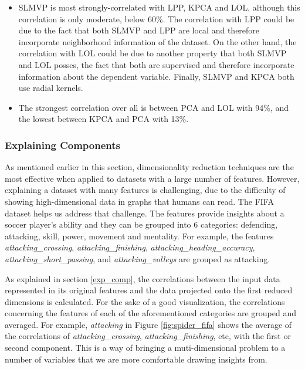 \begin{itemize}
    \item SLMVP is most strongly-correlated with LPP, KPCA and LOL, although this correlation is only moderate, below 60\%. The correlation with LPP could be due to the fact that both SLMVP and LPP are local and therefore incorporate neighborhood information of the dataset. On the other hand, the correlation with LOL could be due to another property that both SLMVP and LOL posses, the fact that both are supervised and therefore incorporate information about the dependent variable. Finally, SLMVP and KPCA both use radial kernels.
    \item The strongest correlation over all is between PCA and LOL with 94\%, and the lowest between KPCA and PCA with 13\%.
\end{itemize}

\subsubsection{Explaining Components}

As mentioned earlier in this section, dimensionality reduction techniques are the most effective when applied to datasets with a large number of features. However, explaining a dataset with many features is challenging, due to the difficulty of showing high-dimensional data in graphs that humans can read. The FIFA dataset helps us address that challenge. The features provide insights about a soccer player's ability and they can be grouped into 6 categories: defending, attacking, skill, power, movement and mentality. For example, the features \textit{attacking\_crossing}, \textit{attacking\_finishing}, \textit{attacking\_heading\_accuracy}, \textit{attacking\_short\_passing}, and \textit{attacking\_volleys} are grouped as attacking.

As explained in section \ref{exp_comp}, the correlations between the input data represented in its original features and the data projected onto the first reduced dimensions is calculated. For the sake of a good visualization, the correlations concerning the features of each of the aforementioned categories are grouped and averaged. For example, \textit{attacking} in Figure \ref{fig:spider_fifa} shows the average of the correlations of \textit{attacking\_crossing}, \textit{attacking\_finishing}, etc, with the first or second component. This is a way of bringing a muti-dimensional problem to a number of variables that we are more comfortable drawing insights from.

